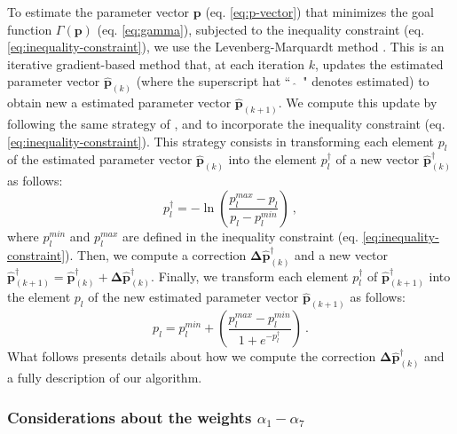 To estimate the parameter vector $\mathbf{p}$ (eq. \ref{eq:p-vector}) that minimizes the goal function 
$\Gamma(\mathbf{p})$ (eq. \ref{eq:gamma}), subjected to the inequality constraint (eq. \ref{eq:inequality-constraint}), 
we use the Levenberg-Marquardt method \cite[e.g., ][ p. 240]{aster-etal2019}. 
This is an iterative gradient-based method that, at each iteration $k$, updates the estimated 
parameter vector $\hat{\mathbf{p}}_{(k)}$ (where the superscript hat ``~$\hat{}$~" denotes estimated) 
to obtain new a estimated parameter vector $\hat{\mathbf{p}}_{(k+1)}$.
We compute this update by following the same strategy 
of \cite{barbosa-1999b}, \cite{oliveirajr-etal2011} and \cite{oliveirajr-barbosa2013} to
incorporate the inequality constraint (eq. \ref{eq:inequality-constraint}). 
This strategy consists in transforming each element $p_{l}$ of the estimated parameter vector 
$\hat{\mathbf{p}}_{(k)}$ into the element $p^{\dagger}_{l}$ of a new vector $\hat{\mathbf{p}}^{\dagger}_{(k)}$
as follows:
\begin{equation}\label{eq:inequality-function}
p^{\dagger}_{l} = -\ln\left(\frac{p_{l}^{max} - p_{l}}{p_{l} - p_{l}^{min}}\right) \: ,
\end{equation}
where $p_{l}^{min}$ and $p_{l}^{max}$ are defined in the inequality constraint 
(eq. \ref{eq:inequality-constraint}).
Then, we compute a correction $\boldsymbol{\Delta}\hat{\mathbf{p}}^{\dagger}_{(k)}$ and a new vector 
$\hat{\mathbf{p}}^{\dagger}_{(k+1)} = \hat{\mathbf{p}}^{\dagger}_{(k)} + \boldsymbol{\Delta}\hat{\mathbf{p}}^{\dagger}_{(k)}$.
Finally, we transform each element $p^{\dagger}_{l}$ of $\hat{\mathbf{p}}^{\dagger}_{(k+1)}$ into the element 
$p_{l}$ of the new estimated parameter vector $\hat{\mathbf{p}}_{(k+1)}$ as follows:
\begin{equation}\label{eq:inv-inequality-function}
p_{l} = p_{l}^{min} + \left(\frac{p_{l}^{max} - p_{l}^{min}}{ 1 + e^{-p^{\dagger}_{l}} }\right) \: .
\end{equation}
What follows presents details about how we compute the correction 
$\boldsymbol{\Delta}\hat{\mathbf{p}}^{\dagger}_{(k)}$ and a fully description of our algorithm.

\subsubsection{Considerations about the weights $\alpha_{1}-\alpha_{7}$}

